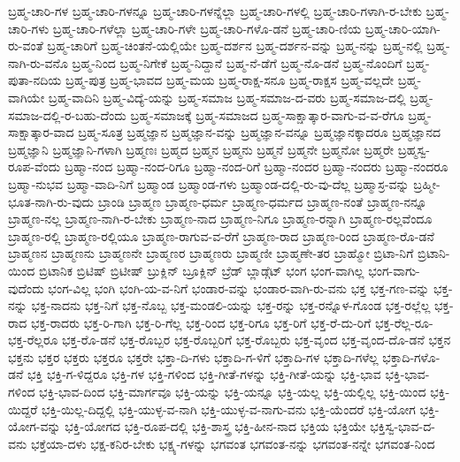 {ಬ್ರಹ್ಮ-ಚಾರಿ-ಗಳ
ಬ್ರಹ್ಮ-ಚಾರಿ-ಗಳನ್ನೂ
ಬ್ರಹ್ಮ-ಚಾರಿ-ಗಳನ್ನೆಲ್ಲಾ
ಬ್ರಹ್ಮ-ಚಾರಿ-ಗಳಲ್ಲಿ
ಬ್ರಹ್ಮ-ಚಾರಿ-ಗಳಾಗಿ-ರ-ಬೇಕು
ಬ್ರಹ್ಮ-ಚಾರಿ-ಗಳು
ಬ್ರಹ್ಮ-ಚಾರಿ-ಗಳೆಲ್ಲಾ
ಬ್ರಹ್ಮ-ಚಾರಿ-ಗಳೇ
ಬ್ರಹ್ಮ-ಚಾರಿ-ಗಳೊ-ಡನೆ
ಬ್ರಹ್ಮ-ಚಾರಿ-ಣಿಯ
ಬ್ರಹ್ಮ-ಚಾರಿ-ಯಾಗಿ-ರು-ವಂತೆ
ಬ್ರಹ್ಮ-ಚಾರಿಗೆ
ಬ್ರಹ್ಮ-ಚಿಂತನೆ-ಯಲ್ಲಿಯೇ
ಬ್ರಹ್ಮ-ದರ್ಶನ
ಬ್ರಹ್ಮ-ದರ್ಶನ-ವನ್ನು
ಬ್ರಹ್ಮ-ನನ್ನು
ಬ್ರಹ್ಮ-ನಲ್ಲಿ
ಬ್ರಹ್ಮ-ನಾಗಿ-ರು-ವನೊ
ಬ್ರಹ್ಮ-ನಿಂದ
ಬ್ರಹ್ಮ-ನಿಗೇಕೆ
ಬ್ರಹ್ಮ-ನಿದ್ದಾನೆ
ಬ್ರಹ್ಮ-ನೆ-ಡೆಗೆ
ಬ್ರಹ್ಮ-ನೊ-ಡನೆ
ಬ್ರಹ್ಮ-ನೊಂದಿಗೆ
ಬ್ರಹ್ಮ-ಪುತಾ-ನದಿಯ
ಬ್ರಹ್ಮ-ಪುತ್ರ
ಬ್ರಹ್ಮ-ಭಾವದ
ಬ್ರಹ್ಮ-ಮಯ
ಬ್ರಹ್ಮ-ರಾಕ್ಷ-ಸನೂ
ಬ್ರಹ್ಮ-ರಾಕ್ಷಸ
ಬ್ರಹ್ಮ-ವಲ್ಲದೇ
ಬ್ರಹ್ಮ-ವಾಗಿಯೇ
ಬ್ರಹ್ಮ-ವಾದಿನಿ
ಬ್ರಹ್ಮ-ವಿದ್ಯೆ-ಯನ್ನು
ಬ್ರಹ್ಮ-ಸಮಾಜ
ಬ್ರಹ್ಮ-ಸಮಾಜ-ದ-ವರು
ಬ್ರಹ್ಮ-ಸಮಾಜ-ದಲ್ಲಿ
ಬ್ರಹ್ಮ-ಸಮಾಜ-ದಲ್ಲಿ-ರ-ಬಹು-ದೆಂದು
ಬ್ರಹ್ಮ-ಸಮಾಜಕ್ಕೆ
ಬ್ರಹ್ಮ-ಸಮಾಜದ
ಬ್ರಹ್ಮ-ಸಾಕ್ಷಾತ್ಕಾರ-ವಾಗು-ವ-ವ-ರೆಗೂ
ಬ್ರಹ್ಮ-ಸಾಕ್ಷಾತ್ಕಾರ-ವಾದ
ಬ್ರಹ್ಮ-ಸೂತ್ರ
ಬ್ರಹ್ಮಜ್ಞಾನ
ಬ್ರಹ್ಮಜ್ಞಾನ-ವನ್ನು
ಬ್ರಹ್ಮಜ್ಞಾನ-ವನ್ನೂ
ಬ್ರಹ್ಮಜ್ಞಾನಕ್ಕಾದರೂ
ಬ್ರಹ್ಮಜ್ಞಾನದ
ಬ್ರಹ್ಮಜ್ಞಾನಿ
ಬ್ರಹ್ಮಜ್ಞಾನಿ-ಗಳಾಗಿ
ಬ್ರಹ್ಮಣಃ
ಬ್ರಹ್ಮದ
ಬ್ರಹ್ಮನ
ಬ್ರಹ್ಮನು
ಬ್ರಹ್ಮನೆ
ಬ್ರಹ್ಮನೇ
ಬ್ರಹ್ಮನೋ
ಬ್ರಹ್ಮರೇ
ಬ್ರಹ್ಮಸ್ವ-ರೂಪ-ವೆಂದು
ಬ್ರಹ್ಮಾ-ನಂದ
ಬ್ರಹ್ಮಾ-ನಂದ-ರಿಗೂ
ಬ್ರಹ್ಮಾ-ನಂದ-ರಿಗೆ
ಬ್ರಹ್ಮಾ-ನಂದರ
ಬ್ರಹ್ಮಾ-ನಂದರು
ಬ್ರಹ್ಮಾ-ನಂದರೂ
ಬ್ರಹ್ಮಾ-ನುಭವ
ಬ್ರಹ್ಮಾ-ವಾದಿ-ನಿಗೆ
ಬ್ರಹ್ಮಾಂಡ
ಬ್ರಹ್ಮಾಂಡ-ಗಳು
ಬ್ರಹ್ಮಾಂಡ-ದಲ್ಲಿ-ರು-ವು-ದೆಲ್ಲ
ಬ್ರಹ್ಮಾಸ್ರ-ವನ್ನು
ಬ್ರಹ್ಮೀ-ಭೂತ-ನಾಗಿ-ರು-ವುದು
ಬ್ರಾಂಡಿ
ಬ್ರಾಹ್ಮಣ
ಬ್ರಾಹ್ಮಣ-ಧರ್ಮ
ಬ್ರಾಹ್ಮಣ-ಧರ್ಮದ
ಬ್ರಾಹ್ಮಣ-ನಂತೆ
ಬ್ರಾಹ್ಮಣ-ನನ್ನೂ
ಬ್ರಾಹ್ಮಣ-ನಲ್ಲ
ಬ್ರಾಹ್ಮಣ-ನಾಗಿ-ರ-ಬೇಕು
ಬ್ರಾಹ್ಮಣ-ನಾದ
ಬ್ರಾಹ್ಮಣ-ನಿಗೂ
ಬ್ರಾಹ್ಮಣ-ರನ್ನಾಗಿ
ಬ್ರಾಹ್ಮಣ-ರಲ್ಲವೆಂದೂ
ಬ್ರಾಹ್ಮಣ-ರಲ್ಲಿ
ಬ್ರಾಹ್ಮಣ-ರಲ್ಲಿಯೂ
ಬ್ರಾಹ್ಮಣ-ರಾಗುವ-ವ-ರೆಗೆ
ಬ್ರಾಹ್ಮಣ-ರಾದ
ಬ್ರಾಹ್ಮಣ-ರಿಂದ
ಬ್ರಾಹ್ಮಣ-ರೊ-ಡನೆ
ಬ್ರಾಹ್ಮಣನ
ಬ್ರಾಹ್ಮಣನು
ಬ್ರಾಹ್ಮಣನೇ
ಬ್ರಾಹ್ಮಣರ
ಬ್ರಾಹ್ಮಣರು
ಬ್ರಾಹ್ಮಣೀ
ಬ್ರಾಹ್ಮಣೇ-ತರ
ಬ್ರಾಹ್ಮೋ
ಬ್ರಿಟಾ-ನಿಗೆ
ಬ್ರಿಟಾನಿ-ಯಿಂದ
ಬ್ರಿಟಾನಿಕ
ಬ್ರಿಟಿಷ್
ಬ್ರಿಟೀಷ್
ಬ್ರುಕ್ಲಿನ್
ಬ್ರೂಕ್ಲಿನ್
ಬ್ರೆಡ್
ಬ್ಲಾಡ್ಗೆಟ್
ಭಂಗ
ಭಂಗ-ವಾಗಿಲ್ಲ
ಭಂಗ-ವಾಗು-ವುದೆಂದು
ಭಂಗ-ವಿಲ್ಲ
ಭಂಗಿ
ಭಂಗಿ-ಯ-ವ-ನಿಗೆ
ಭಂಡಾರ-ವನ್ನು
ಭಂಡಾರ-ವಾಗಿ-ರು-ವನು
ಭಕ್ತ
ಭಕ್ತ-ಗಣ-ವನ್ನು
ಭಕ್ತ-ನನ್ನು
ಭಕ್ತ-ನಾದನು
ಭಕ್ತ-ನಿಗೆ
ಭಕ್ತ-ನೊಬ್ಬ
ಭಕ್ತ-ಮಂಡಲಿ-ಯನ್ನು
ಭಕ್ತ-ರನ್ನು
ಭಕ್ತ-ರನ್ನೊಳ-ಗೊಂಡ
ಭಕ್ತ-ರಲ್ಲೆಲ್ಲ
ಭಕ್ತ-ರಾದ
ಭಕ್ತ-ರಾದರು
ಭಕ್ತ-ರಿ-ಗಾಗಿ
ಭಕ್ತ-ರಿ-ಗೆಲ್ಲ
ಭಕ್ತ-ರಿಂದ
ಭಕ್ತ-ರಿಗೂ
ಭಕ್ತ-ರಿಗೆ
ಭಕ್ತ-ರೆ-ದು-ರಿಗೆ
ಭಕ್ತ-ರೆಲ್ಲ-ರೂ-
ಭಕ್ತ-ರೆಲ್ಲರೂ
ಭಕ್ತ-ರೊ-ಡನೆ
ಭಕ್ತ-ರೊಬ್ಬರ
ಭಕ್ತ-ರೊಬ್ಬರಿಗೆ
ಭಕ್ತ-ರೊಬ್ಬರು
ಭಕ್ತ-ವೃಂದ
ಭಕ್ತ-ವೃಂದ-ದೊ-ಡನೆ
ಭಕ್ತನ
ಭಕ್ತನು
ಭಕ್ತರ
ಭಕ್ತರು
ಭಕ್ತರೂ
ಭಕ್ತರೇ
ಭಕ್ತಾ-ದಿ-ಗಳು
ಭಕ್ತಾದಿ-ಗ-ಳಿಗೆ
ಭಕ್ತಾದಿ-ಗಳ
ಭಕ್ತಾದಿ-ಗಳೆಲ್ಲ
ಭಕ್ತಾದಿ-ಗಳೊ-ಡನೆ
ಭಕ್ತಿ
ಭಕ್ತಿ-ಗ-ಳಿದ್ದರೂ
ಭಕ್ತಿ-ಗಳ
ಭಕ್ತಿ-ಗಳಿಂದ
ಭಕ್ತಿ-ಗೀತೆ-ಗಳನ್ನು
ಭಕ್ತಿ-ಗೀತೆ-ಯನ್ನು
ಭಕ್ತಿ-ಭಾವ
ಭಕ್ತಿ-ಭಾವ-ಗಳಿಂದ
ಭಕ್ತಿ-ಭಾವ-ದಿಂದ
ಭಕ್ತಿ-ಮಾರ್ಗವೂ
ಭಕ್ತಿ-ಯನ್ನು
ಭಕ್ತಿ-ಯನ್ನೂ
ಭಕ್ತಿ-ಯಲ್ಲ
ಭಕ್ತಿ-ಯಲ್ಲಿಲ್ಲ
ಭಕ್ತಿ-ಯಿಂದ
ಭಕ್ತಿ-ಯಿದ್ದರೆ
ಭಕ್ತಿ-ಯಿಲ್ಲ-ದಿದ್ದಲ್ಲಿ
ಭಕ್ತಿ-ಯುಳ್ಳ-ವ-ನಾಗಿ
ಭಕ್ತಿ-ಯುಳ್ಳ-ವ-ನಾಗು-ವನು
ಭಕ್ತಿ-ಯೆಂದರೆ
ಭಕ್ತಿ-ಯೋಗ
ಭಕ್ತಿ-ಯೋಗ-ವನ್ನು
ಭಕ್ತಿ-ಯೋಗದ
ಭಕ್ತಿ-ರೂಪ-ದಲ್ಲಿ
ಭಕ್ತಿ-ಶಾಸ್ತ್ರ
ಭಕ್ತಿ-ಹೀನ-ನಾದ
ಭಕ್ತಿಯ
ಭಕ್ತಿಯೇ
ಭಕ್ತಿಸ್ವ-ಭಾವ-ದ-ವನು
ಭಕ್ತೆಯಾ-ದಳು
ಭಕ್ಷ-ಕನಿರ-ಬೇಕು
ಭಕ್ಷ್ಯ-ಗಳನ್ನು
ಭಗವಂತ
ಭಗವಂತ-ನನ್ನು
ಭಗವಂತ-ನನ್ನೇ
ಭಗವಂತ-ನಿಂದ
}
